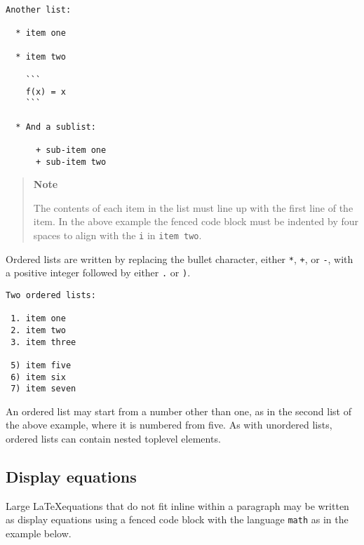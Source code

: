 \begin{lstlisting}
Another list:

  * item one

  * item two

    ```
    f(x) = x
    ```

  * And a sublist:

      + sub-item one
      + sub-item two
\end{lstlisting}



\begin{quote}
\textbf{Note}

The contents of each item in the list must line up with the first line of the item. In the above example the fenced code block must be indented by four spaces to align with the \texttt{i} in \texttt{item two}.

\end{quote}


Ordered lists are written by replacing the {\textquotedbl}bullet{\textquotedbl} character, either \texttt{*}, \texttt{+}, or \texttt{-}, with a positive integer followed by either \texttt{.} or \texttt{)}.




\begin{lstlisting}
Two ordered lists:

 1. item one
 2. item two
 3. item three

 5) item five
 6) item six
 7) item seven
\end{lstlisting}



An ordered list may start from a number other than one, as in the second list of the above example, where it is numbered from five. As with unordered lists, ordered lists can contain nested toplevel elements.



\hypertarget{8249559303631128892}{}


\subsection{Display equations}



Large \LaTeX equations that do not fit inline within a paragraph may be written as display equations using a fenced code block with the {\textquotedbl}language{\textquotedbl} \texttt{math} as in the example below.




